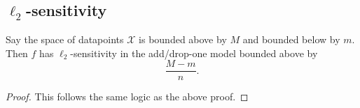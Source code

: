 \documentclass[11pt]{scrartcl} %
\begin{document}
\subsection{$\ell_2$-sensitivity}

\begin{theorem}
Say the space of datapoints $\mathcal{X}$ is bounded above by $M$ and bounded below by $m$. Then $f$ has $\ell_2$-sensitivity in the add/drop-one model bounded above by
	$$ \frac{M-m}{n}. $$
\end{theorem}

\begin{proof}
This follows the same logic as the above proof.
%
%
%	
%
%
%
\end{proof}

% 
% 
\end{document}
